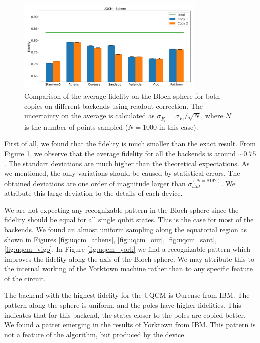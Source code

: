 \begin{figure}[H]
    \centering
            \includegraphics[width=0.8\textwidth]{Figures/UQCM/Histograms/histo_sphere.png}
        
        \caption{Comparison of the average fidelity on the Bloch sphere for both copies on different backends using readout correction. The uncertainty on the average is calculated as $\sigma_{\overline{F}_i}=\sigma_{F_i}/\sqrt{N}$, where $N$ is the number of points sampled ($N=1000$ in this case).}\label{fig:hist_uqcm_sphere}
\end{figure}

First of all, we found that the fidelity is much smaller than the exact result. From Figure \ref{fig:hist_uqcm_sphere}, we observe that the average fidelity for all the backends is around $\sim 0.75$. The standart deviations are much higher than the theoretical expectations. As we mentioned, the only variations should be caused by statistical errors. The obtained deviations are one order of magnitude larger than $\sigma_{stat}^{(N=8192)}$. We attribute this large deviation to the details of each device. 

We are not expecting any recognizable pattern in the Bloch sphere since the fidelity should be equal for all single qubit states. This is the case for most of the backends. We found an almost uniform sampling along the equatorial region as shown in Figures \ref{fig:uqcm_athens}, \ref{fig:uqcm_our}, \ref{fig:uqcm_sant}, \ref{fig:uqcm_vigo}. In Figure \ref{fig:uqcm_york} we find a recognizable pattern which improves the fidelity along the axis of the Bloch sphere. We may attribute this to the internal working of the Yorktown machine rather than to any specific feature of the circuit. 

The backend with the highest fidelity for the UQCM is Ourense from IBM. The pattern along the sphere is uniform, and the poles have higher fidelities. This indicates that for this backend, the states closer to the poles are copied better. We found a patter emerging in the results of Yorktown from IBM. This pattern is not a feature of the algorithm, but produced by the device.

